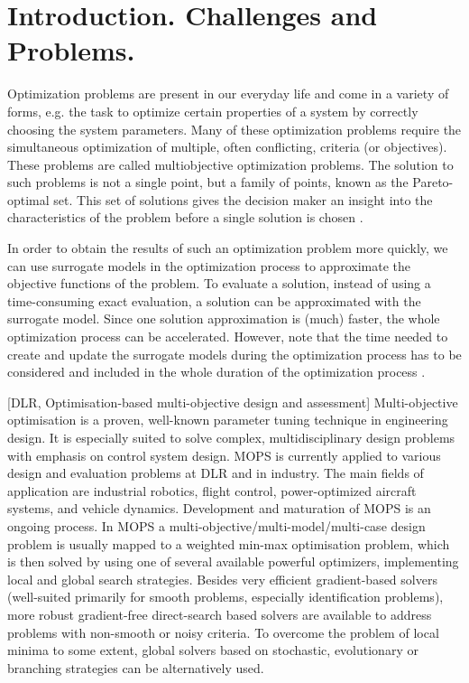 \chapter{Introduction. Challenges and Problems.}

Optimization problems are present in our everyday life and come in a variety of forms, e.g. 
the task to optimize certain properties of a system by correctly choosing the system parameters. 
Many of these optimization problems require the simultaneous optimization of multiple, often conflicting, 
criteria (or objectives). These problems are called multiobjective optimization problems. 
The solution to such problems is not a single point, but a family of points, 
known as the Pareto-optimal set. This set of solutions gives the decision maker an insight 
into the characteristics of the problem before a single solution is chosen \cite{MlakarPTF15}.


In order to obtain the results of such an optimization problem more quickly, we can use surrogate
models in the optimization process to approximate the objective functions of the problem. To evaluate a 
solution, instead of using a time-consuming exact evaluation, a solution can be approximated with the 
surrogate model. Since one solution approximation is (much) faster, the whole optimization process can 
be accelerated. However, note that the time needed to create and update the surrogate models during the 
optimization process has to be considered and included in the whole duration of the optimization process \cite{MlakarPTF15}.

[DLR, Optimisation-based multi-objective design and assessment] 
Multi-objective optimisation is a proven, well-known parameter tuning technique in engineering design. It is especially suited 
to solve complex, multidisciplinary design problems with emphasis on control system design.
MOPS is currently applied to various design and evaluation problems at DLR and in industry. The main fields 
of application are industrial robotics, flight control, power-optimized aircraft systems, and vehicle dynamics. Development and maturation of MOPS is an ongoing process.
In MOPS a multi-objective/multi-model/multi-case design problem is usually mapped to a weighted min-max optimisation problem, which is then solved by using one of several 
available powerful optimizers, implementing local and global search strategies. Besides very efficient gradient-based solvers (well-suited primarily for smooth problems, 
especially identification problems), more robust gradient-free direct-search based solvers are available to address problems with non-smooth or noisy criteria. To overcome the 
problem of local minima to some extent, global solvers based on stochastic, evolutionary or branching strategies can be alternatively used.

